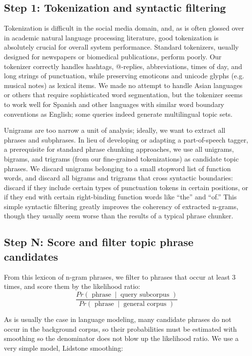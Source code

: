 \documentclass[letterpaper]{article}
\newcommand{\codenote}[1]{}
\begin{document}
\subsection{Step 1: Tokenization and syntactic filtering}

Tokenization is difficult in the social media domain, and, as is often glossed over in academic natural language processing literature, good tokenization is absolutely crucial for overall system performance.  Standard tokenizers, usually designed for newspapers or biomedical publications, perform poorly.  Our tokenizer correctly handles hashtags, @-replies, abbreviations, times of day, and long strings of punctuation, while preserving emoticons and unicode glyphs (e.g. musical notes) as lexical items.  We made no attempt to handle Asian languages or others that require sophisticated word segmentation, but the tokenizer seems to work well for Spanish and other languages with similar word boundary conventions as English; some queries indeed generate multilingual topic sets.

Unigrams are too narrow a unit of analysis; ideally, we want to extract all phrases and subphrases.  In lieu of developing or adapting a part-of-speech tagger, a prerequisite for standard phrase chunking approaches, we use all unigrams, bigrams, and trigrams (from our fine-grained tokenizations) as candidate topic phrases.  We discard unigrams belonging to a small stopword list of function words, and discard all bigrams and trigrams that cross syntactic boundaries: discard if they include certain types of punctuation tokens in certain positions, or if they end with certain right-binding function words like ``the'' and ``of.''  This simple syntactic filtering greatly improves the coherency of extracted n-grams, though they usually seem worse than the results of a typical phrase chunker.


\subsection{Step N: Score and filter topic phrase candidates}

\codenote{lang_model.py, ranking.py}
From this lexicon of n-gram phrases, we filter to phrases that occur at least 3 times, and score them by the likelihood ratio:
\[\frac{Pr(\textrm{ phrase } \ |\ \textrm{ query subcorpus })}
{Pr(\textrm{ phrase } \ |\ \textrm{ general corpus })}
\]

As is usually the case in language modeling, many candidate phrases do not occur in the background corpus, so their probabilities must be estimated with smoothing so the denominator does not blow up the likelihood ratio.  We use a very simple model, Lidstone smoothing:
\end{document}
